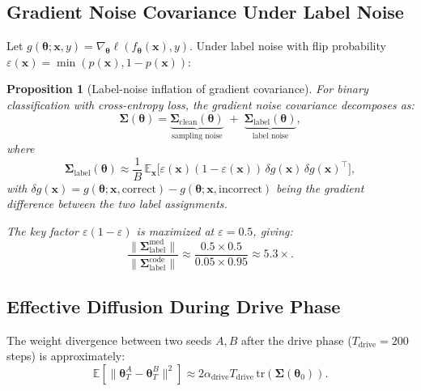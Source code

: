\documentclass{article}
\newtheorem{proposition}{Proposition}
\newcommand{\btheta}{\boldsymbol{\theta}}
\newcommand{\bSigma}{\boldsymbol{\Sigma}}
\newcommand{\E}{\mathbb{E}}
\begin{document}
\subsection{Gradient Noise Covariance Under Label Noise}

Let $g(\btheta; \mathbf{x}, y) = \nabla_\btheta \ell(f_\btheta(\mathbf{x}), y)$.
Under label noise with flip probability $\varepsilon(\mathbf{x}) =
\min(p(\mathbf{x}), 1-p(\mathbf{x}))$:

\begin{proposition}[Label-noise inflation of gradient covariance]
\label{prop:noise}
For binary classification with cross-entropy loss, the gradient noise
covariance decomposes as:
\begin{equation}
\bSigma(\btheta) = \underbrace{\bSigma_{\text{clean}}(\btheta)}_{\text{sampling noise}} \;+\;
\underbrace{\bSigma_{\text{label}}(\btheta)}_{\text{label noise}},
\end{equation}
where
\begin{equation}
\bSigma_{\text{label}}(\btheta) \approx \frac{1}{B}\,\E_{\mathbf{x}}\Big[
\varepsilon(\mathbf{x})(1 - \varepsilon(\mathbf{x}))\,
\delta g(\mathbf{x}) \, \delta g(\mathbf{x})^\top \Big],
\end{equation}
with $\delta g(\mathbf{x}) = g(\btheta; \mathbf{x}, \text{correct}) - g(\btheta; \mathbf{x}, \text{incorrect})$
being the gradient difference between the two label assignments.

The key factor $\varepsilon(1-\varepsilon)$ is maximized at $\varepsilon = 0.5$,
giving:
\begin{equation}
\frac{\|\bSigma_{\text{label}}^{\text{med}}\|}{\|\bSigma_{\text{label}}^{\text{code}}\|}
\approx \frac{0.5 \times 0.5}{0.05 \times 0.95} \approx 5.3\times.
\end{equation}
\end{proposition}

\subsection{Effective Diffusion During Drive Phase}

The weight divergence between two seeds $A, B$ after the drive phase
($T_{\text{drive}} = 200$ steps) is approximately:
\begin{equation}
\E[\|\btheta_T^A - \btheta_T^B\|^2] \approx
2\alpha_{\text{drive}} T_{\text{drive}} \, \mathrm{tr}(\bSigma(\btheta_0)).
\label{eq:divergence}
\end{equation}
\end{document}
